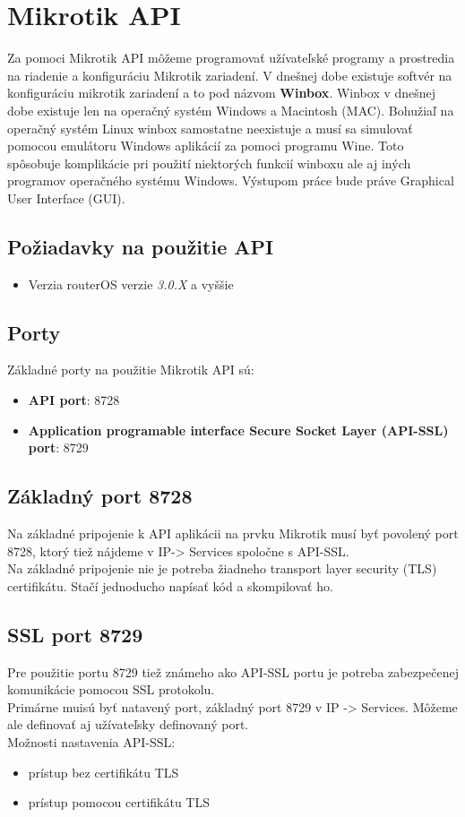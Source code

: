 \section{Mikrotik API}
Za pomoci Mikrotik API môžeme programovať užívateľské programy a prostredia na riadenie a konfiguráciu Mikrotik zariadení. V dnešnej dobe existuje softvér na konfiguráciu mikrotik zariadení a to pod názvom \textbf{Winbox}. Winbox v dnešnej dobe existuje len na operačný systém Windows a Macintosh (MAC). Bohužiaľ na operačný systém Linux winbox samostatne neexistuje a musí sa simulovať pomocou emulátoru Windows aplikácií za pomoci programu Wine. Toto spôsobuje komplikácie pri použití niektorých funkcií winboxu ale aj iných programov operačného systému Windows. Výstupom práce bude práve Graphical User Interface (GUI). 
\subsection{Požiadavky na použitie API}
\begin{itemize}
\item Verzia routerOS verzie \textit{3.0.X} a vyššie \cite{API}
\end{itemize}
\subsection{Porty}
Základné porty na použitie Mikrotik API \cite{API} sú:
\begin{itemize}
\item \textbf{API port}: 8728
\item \textbf{Application programable interface Secure Socket Layer (API-SSL) port}: 8729
\end{itemize}
\subsection{Základný port 8728}
Na základné pripojenie k API aplikácii na prvku Mikrotik musí byť povolený port 8728, ktorý tiež nájdeme v IP-> Services spoločne s API-SSL.\\
Na základné pripojenie nie je potreba žiadneho transport layer security (TLS) certifikátu. Stačí jednoducho napísať kód a skompilovať ho. 
\subsection{SSL port 8729}
Pre použitie portu 8729 tiež známeho ako API-SSL portu je potreba zabezpečenej komunikácie pomocou SSL protokolu. \\
Primárne muisú byť natavený port, základný port 8729 v IP -> Services. Môžeme ale definovať aj užívateľsky definovaný port. \\
Možnosti nastavenia API-SSL:
\begin{itemize}
\item prístup bez certifikátu TLS
\item prístup pomocou certifikátu TLS
\end{itemize} 
